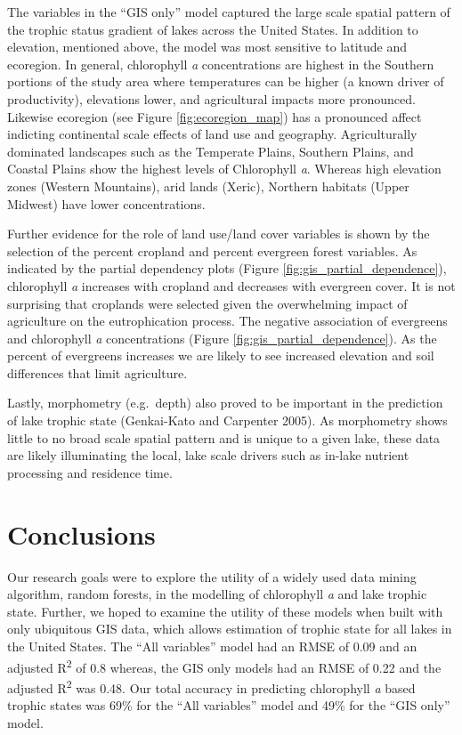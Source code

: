 \documentclass[12pt,]{article}
\begin{document}
The variables in the ``GIS only'' model captured the large scale spatial
pattern of the trophic status gradient of lakes across the United
States. In addition to elevation, mentioned above, the model was most
sensitive to latitude and ecoregion. In general, chlorophyll \emph{a}
concentrations are highest in the Southern portions of the study area
where temperatures can be higher (a known driver of productivity),
elevations lower, and agricultural impacts more pronounced. Likewise
ecoregion (see Figure \ref{fig:ecoregion_map}) has a pronounced affect
indicting continental scale effects of land use and geography.
Agriculturally dominated landscapes such as the Temperate Plains,
Southern Plains, and Coastal Plains show the highest levels of
Chlorophyll \emph{a}. Whereas high elevation zones (Western Mountains),
arid lands (Xeric), Northern habitats (Upper Midwest) have lower
concentrations.

Further evidence for the role of land use/land cover variables is shown
by the selection of the percent cropland and percent evergreen forest
variables. As indicated by the partial dependency plots (Figure
\ref{fig:gis_partial_dependence}), chlorophyll \emph{a} increases with
cropland and decreases with evergreen cover. It is not surprising that
croplands were selected given the overwhelming impact of agriculture on
the eutrophication process. The negative association of evergreens and
chlorophyll \emph{a} concentrations (Figure
\ref{fig:gis_partial_dependence}). As the percent of evergreens
increases we are likely to see increased elevation and soil differences
that limit agriculture.

Lastly, morphometry (e.g.~depth) also proved to be important in the
prediction of lake trophic state (Genkai-Kato and Carpenter 2005). As
morphometry shows little to no broad scale spatial pattern and is unique
to a given lake, these data are likely illuminating the local, lake
scale drivers such as in-lake nutrient processing and residence time.

\section{Conclusions}\label{conclusions}

Our research goals were to explore the utility of a widely used data
mining algorithm, random forests, in the modelling of chlorophyll
\emph{a} and lake trophic state. Further, we hoped to examine the
utility of these models when built with only ubiquitous GIS data, which
allows estimation of trophic state for all lakes in the United States.
The ``All variables'' model had an RMSE of 0.09 and an adjusted
R\textsuperscript{2} of 0.8 whereas, the GIS only models had an RMSE of
0.22 and the adjusted R\textsuperscript{2} was 0.48. Our total accuracy
in predicting chlorophyll \emph{a} based trophic states was 69\% for the
``All variables'' model and 49\% for the ``GIS only'' model.
\end{document}
